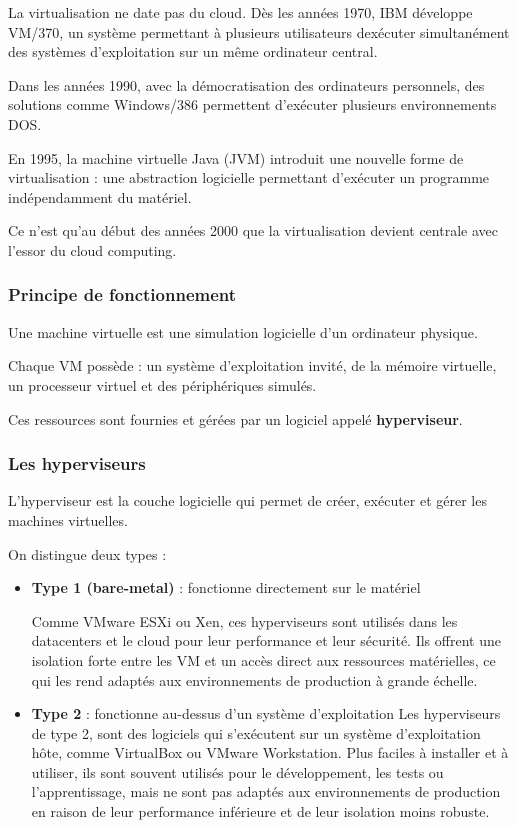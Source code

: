\documentclass{report} %
\begin{document}
La virtualisation ne date pas du cloud. Dès les années 1970, IBM développe VM/370, un système permettant à plusieurs utilisateurs dexécuter simultanément des systèmes d’exploitation sur un même ordinateur central.

Dans les années 1990, avec la démocratisation des ordinateurs personnels, des solutions comme Windows/386 permettent d’exécuter plusieurs environnements DOS.

En 1995, la machine virtuelle Java (JVM) introduit une nouvelle forme de virtualisation : une abstraction logicielle permettant d’exécuter un programme indépendamment du matériel.

Ce n’est qu’au début des années 2000 que la virtualisation devient centrale avec l’essor du cloud computing.

\subsubsection{Principe de fonctionnement}

Une machine virtuelle est une simulation logicielle d’un ordinateur physique.

Chaque VM possède : un système d’exploitation invité, de la mémoire virtuelle, un processeur virtuel et des périphériques simulés.

Ces ressources sont fournies et gérées par un logiciel appelé \textbf{hyperviseur}.

\subsubsection{Les hyperviseurs}

L’hyperviseur est la couche logicielle qui permet de créer, exécuter et gérer les machines virtuelles.

On distingue deux types :

\begin{itemize}
\item \textbf{Type 1 (bare-metal)} : fonctionne directement sur le matériel

Comme VMware ESXi ou Xen, ces hyperviseurs sont utilisés dans les datacenters et le cloud pour leur performance et leur sécurité.
Ils offrent une isolation forte entre les VM et un accès direct aux ressources matérielles, ce qui les rend adaptés aux environnements de production à grande échelle. 

\item \textbf{Type 2} : fonctionne au-dessus d’un système d’exploitation
Les hyperviseurs de type 2, sont des logiciels qui s’exécutent sur un système d’exploitation hôte, comme VirtualBox ou VMware Workstation.
Plus faciles à installer et à utiliser, ils sont souvent utilisés pour le développement, les tests ou l’apprentissage, 
mais ne sont pas adaptés aux environnements de production en raison de leur performance inférieure et de leur isolation moins robuste.
\end{itemize}
\end{document}
